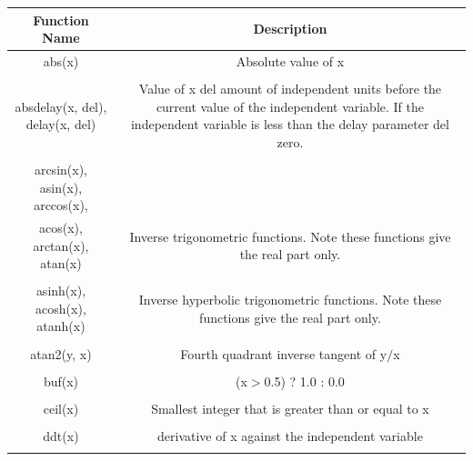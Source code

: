 \begin{longtable}{c c}

\hline\hline %
Function Name & Description \\ [0.5ex] %
\hline %
abs(x) & Absolute value of x \\ \\ %

absdelay(x, del), delay(x, del) & \begin{minipage}{20em}
Value of x del amount of independent units before the current value of the independent variable. If the independent variable is less than the delay parameter del zero.
\end{minipage}\\ \\

arcsin(x), asin(x), arccos(x),\\ 
acos(x), arctan(x), atan(x) & \begin{minipage}{20em}
Inverse trigonometric functions. Note these functions give the real part only.
\end{minipage}\\ \\

asinh(x), acosh(x), atanh(x) & \begin{minipage}{20em}
Inverse hyperbolic trigonometric functions. Note these functions give the real part only.
\end{minipage}\\ \\

atan2(y, x) & \begin{minipage}{20em}
Fourth quadrant inverse tangent of y$/$x
\end{minipage}\\ \\

buf(x) & \begin{minipage}{20em}
(x$>$0.5) ? 1.0 : 0.0
\end{minipage}\\ \\

ceil(x) & \begin{minipage}{20em}
Smallest integer that is greater than or equal to x
\end{minipage}\\ \\

ddt(x) & \begin{minipage}{20em}
derivative of x against the independent variable
\end{minipage}\\ \\


\end{longtable}
